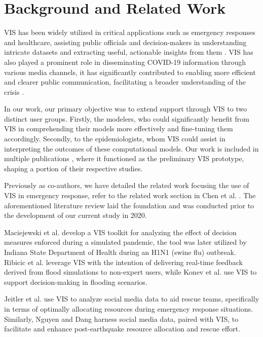 \section{Background and Related Work}

\ac{VIS} has been widely utilized in critical applications such as emergency responses and healthcare, assisting public officials and decision-makers in understanding intricate datasets and extracting useful, actionable insights from them \cite{dusse2016Information}. 
\ac{VIS} has also played a prominent role in disseminating COVID-19 information through various media channels, it has significantly contributed to enabling more efficient and clearer public communication, facilitating a broader understanding of the crisis \cite{johnshopkinsuniversityCOVID19}.

In our work, our primary objective was to extend support through \ac{VIS} to two distinct user groups. Firstly, the modelers, who could significantly benefit from VIS in comprehending their models more effectively and fine-tuning them accordingly. Secondly, to the epidemiologists, whom VIS could assist in interpreting the outcomes of these computational models. Our work is included in multiple publications \cite{chen2022RAMPVIS,dykes2022Visualizationb,khan2022Propagating,khan2022Rapid,rydow2023RAMPVIS}, where it functioned as the preliminary VIS prototype, shaping a portion of their respective studies.


Previously as co-authors, we have detailed the related work focusing the use of \ac{VIS} in emergency response, refer to the related work section in Chen et al. \cite{chen2022RAMPVIS}. The aforementioned literature review laid the foundation and was conducted prior to the development of our current study in 2020.

Maciejewski et al. \cite{maciejewski2011Pandemica} develop a VIS toolkit for analyzing the effect of decision measures enforced during a simulated pandemic, the tool was later utilized by Indiana State Department of Health during an H1N1 (swine flu) outbreak.
Ribicic et al. \cite{ribicic2012Sketching} leverage VIS with the intention of delivering real-time feedback derived from flood simulations to non-expert users, while Konev et al. \cite{konev2014Run} use VIS to support decision-making in flooding scenarios.

Jeitler et al. \cite{jeitler2019RescueMark} use VIS to analyze social media data to aid rescue teams, specifically in terms of optimally allocating resources during emergency response situations. Similarly, Nguyen and Dang \cite{nguyen2019EQSA} harness social media data, paired with VIS, to facilitate and enhance post-earthquake resource allocation and rescue effort.

